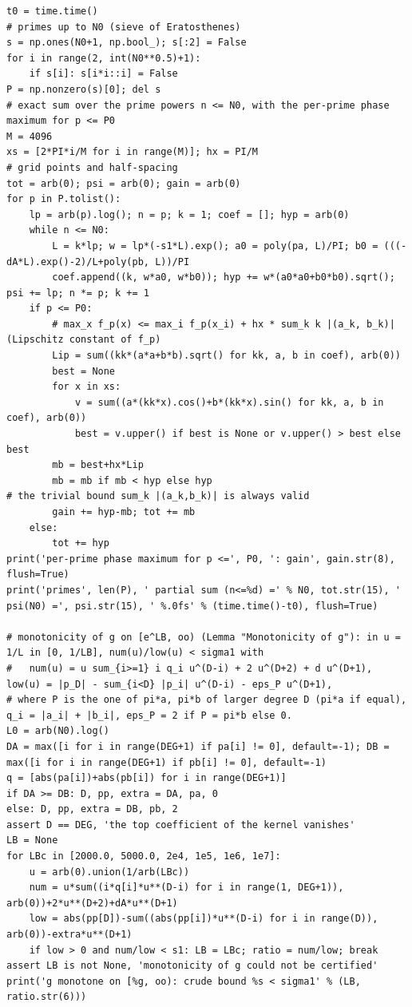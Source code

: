 \documentclass[11pt,reqno]{amsart}
\numberwithin{equation}{section}
\theoremstyle{definition}
\theoremstyle{remark}
\begin{document}
\begin{lstlisting}
t0 = time.time()
# primes up to N0 (sieve of Eratosthenes)
s = np.ones(N0+1, np.bool_); s[:2] = False
for i in range(2, int(N0**0.5)+1):
    if s[i]: s[i*i::i] = False
P = np.nonzero(s)[0]; del s
# exact sum over the prime powers n <= N0, with the per-prime phase maximum for p <= P0
M = 4096
xs = [2*PI*i/M for i in range(M)]; hx = PI/M                              # grid points and half-spacing
tot = arb(0); psi = arb(0); gain = arb(0)
for p in P.tolist():
    lp = arb(p).log(); n = p; k = 1; coef = []; hyp = arb(0)
    while n <= N0:
        L = k*lp; w = lp*(-s1*L).exp(); a0 = poly(pa, L)/PI; b0 = (((-dA*L).exp()-2)/L+poly(pb, L))/PI
        coef.append((k, w*a0, w*b0)); hyp += w*(a0*a0+b0*b0).sqrt(); psi += lp; n *= p; k += 1
    if p <= P0:
        # max_x f_p(x) <= max_i f_p(x_i) + hx * sum_k k |(a_k, b_k)|   (Lipschitz constant of f_p)
        Lip = sum((kk*(a*a+b*b).sqrt() for kk, a, b in coef), arb(0))
        best = None
        for x in xs:
            v = sum((a*(kk*x).cos()+b*(kk*x).sin() for kk, a, b in coef), arb(0))
            best = v.upper() if best is None or v.upper() > best else best
        mb = best+hx*Lip
        mb = mb if mb < hyp else hyp                                       # the trivial bound sum_k |(a_k,b_k)| is always valid
        gain += hyp-mb; tot += mb
    else:
        tot += hyp
print('per-prime phase maximum for p <=', P0, ': gain', gain.str(8), flush=True)
print('primes', len(P), ' partial sum (n<=%d) =' % N0, tot.str(15), ' psi(N0) =', psi.str(15), ' %.0fs' % (time.time()-t0), flush=True)

# monotonicity of g on [e^LB, oo) (Lemma "Monotonicity of g"): in u = 1/L in [0, 1/LB], num(u)/low(u) < sigma1 with
#   num(u) = u sum_{i>=1} i q_i u^(D-i) + 2 u^(D+2) + d u^(D+1),   low(u) = |p_D| - sum_{i<D} |p_i| u^(D-i) - eps_P u^(D+1),
# where P is the one of pi*a, pi*b of larger degree D (pi*a if equal), q_i = |a_i| + |b_i|, eps_P = 2 if P = pi*b else 0.
L0 = arb(N0).log()
DA = max([i for i in range(DEG+1) if pa[i] != 0], default=-1); DB = max([i for i in range(DEG+1) if pb[i] != 0], default=-1)
q = [abs(pa[i])+abs(pb[i]) for i in range(DEG+1)]
if DA >= DB: D, pp, extra = DA, pa, 0
else: D, pp, extra = DB, pb, 2
assert D == DEG, 'the top coefficient of the kernel vanishes'
LB = None
for LBc in [2000.0, 5000.0, 2e4, 1e5, 1e6, 1e7]:
    u = arb(0).union(1/arb(LBc))
    num = u*sum((i*q[i]*u**(D-i) for i in range(1, DEG+1)), arb(0))+2*u**(D+2)+dA*u**(D+1)
    low = abs(pp[D])-sum((abs(pp[i])*u**(D-i) for i in range(D)), arb(0))-extra*u**(D+1)
    if low > 0 and num/low < s1: LB = LBc; ratio = num/low; break
assert LB is not None, 'monotonicity of g could not be certified'
print('g monotone on [%g, oo): crude bound %s < sigma1' % (LB, ratio.str(6)))


\end{lstlisting}
\end{document}
